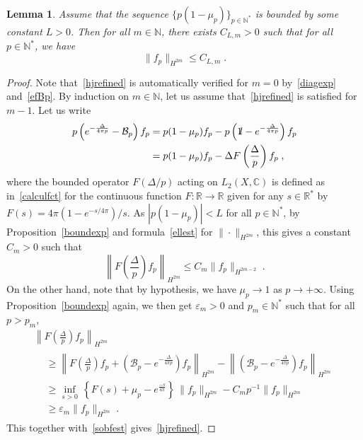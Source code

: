 \documentclass[11pt]{article}
\newtheorem{lemm}[theo]{Lemma}
\theoremstyle{definition}
\numberwithin{equation}{section}
\numberwithin{figure}{section}
\numberwithin{table}{section}
\newcommand{\R}{{\mathbb{R}}}
\newcommand{\N}{{\mathbb{N}}}
\newcommand{\CCC}{{\mathbb{C}}}
\newcommand{\cB}{{\mathcal{B}}}
\newcommand*\id{{1\hskip-2.5pt{\rm l}}}
\renewcommand\leq {\leqslant}
\renewcommand\geq {\geqslant}
\newcommand\< {\mathcal{h}}
\renewcommand\> {\mathcal{i}}
\renewcommand{\epsilon}{\varepsilon}
\newcommand\fl {\rightarrow}
\begin{document}
\begin{lemm}\label{hjrefprop}
Assume that the sequence $\{p(1-\mu_p)\}_{p\in\N^*}$ is bounded by some constant $L>0$. Then for all $m\in\N$, there exists $C_{L,m}>0$ such that for all $p\in\N^*$, we have
\begin{equation}\label{hjrefined}
\|f_p\|_{H^{2m}}\leq C_{L,m}\;.
\end{equation}
\end{lemm}
\begin{proof}
Note that~\eqref{hjrefined} is automatically verified for $m=0$ by~\eqref{diagexp} and~\eqref{efBp}. By induction on $m\in\N$, let us assume that~\eqref{hjrefined} is satisfied for $m-1$. Let us write
\begin{equation}\label{deltFest}
\begin{split}
p\left(e^{-\frac{\Delta}{4\pi p}}-\cB_p\right)f_p&=p(1-\mu_p)f_p- p\left(\id-e^{-\frac{\Delta}{4\pi p}}\right)f_p\\
&=p(1-\mu_p)f_p-\Delta F\left(\frac{\Delta}{p}\right)f_p\;,
\end{split}
\end{equation}
where the bounded operator $F(\Delta/p)$ acting on $L_2(X,\CCC)$ is defined as in~\eqref{calculfct} for the continuous function $F:\R\fl\R$ given for any $s\in\R^*$ by $F(s)=4\pi(1-e^{-s/4\pi})/s$. As $|p(1-\mu_p)|<L$ for all $p\in\N^*$, by Proposition~\ref{boundexp} and formula~\eqref{ellest} for $\|\cdot\|_{H^{2m}}$, this gives a constant $C_m>0$ such that
\begin{equation}\label{sobfest}
\left\|F\left(\frac{\Delta}{p}\right)f_p\right\|_{H^{2m}}\leq C_m\|f_p\|_{H^{2m-2}}\;.
\end{equation}
On the other hand, note that by hypothesis, we have $\mu_p\fl 1$ as $p\fl+\infty$. Using Proposition~\ref{boundexp} again, we then get $\epsilon_m>0$ and $p_m\in\N^*$ such that for all $p>p_m$,
\begin{multline}\label{hjdeltFest}
\left\|F\left(\frac{\Delta}{p}\right)f_p\right\|_{H^{2m}}\\
\begin{aligned}
&\geq\left\|F\left(\frac{\Delta}{p}\right)f_p+\left(\cB_p-e^{-\frac{\Delta}{4\pi p}}\right)f_p\right\|_{H^{2m}} -\left\|\left(\cB_p-e^{-\frac{\Delta}{4\pi p}}\right)f_p\right\|_{H^{2m}}\\
&\geq\inf_{s>0}\,\left\{F(s)+\mu_p-e^{\frac{-s}{4\pi}}\right\}\,\|f_p\|_{H^{2m}} -C_m p^{-1}\|f_p\|_{H^{2m}}\\
&\geq\epsilon_m\|f_p\|_{H^{2m}}\;.
\end{aligned}
\end{multline}
This together with~\eqref{sobfest} gives~\eqref{hjrefined}.
\end{proof}
\end{document}
